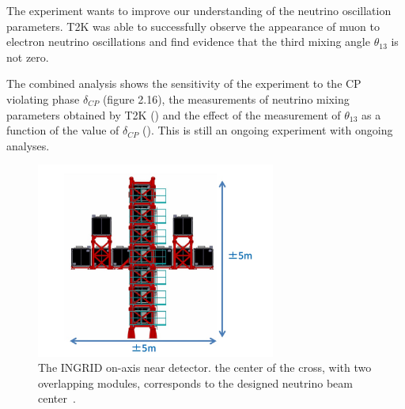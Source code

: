 The experiment wants to improve our understanding of the neutrino oscillation parameters. T2K was able to successfully observe the appearance of muon to electron neutrino oscillations and find evidence that the third mixing angle $\theta_{13}$ is not zero. 

The combined analysis shows the sensitivity of the experiment to the CP violating phase $\delta_{CP}$ (figure 2.16), the measurements of neutrino mixing parameters obtained by T2K () and the effect of the measurement of $\theta_{13}$ as a function of the value of $\delta_{CP}$ (). This is still an ongoing experiment with ongoing analyses.



\begin{figure}[h!]
\centering
  \centering
\includegraphics[width=0.7\textwidth]{figures/ingridPlot.jpeg}
\vspace{2mm}
\caption{The INGRID on-axis near detector. the center of the cross, with two overlapping modules, corresponds to the designed neutrino beam center~\cite{129INGRID}.}
\label{fig:INGRIDdet}
\end{figure}

